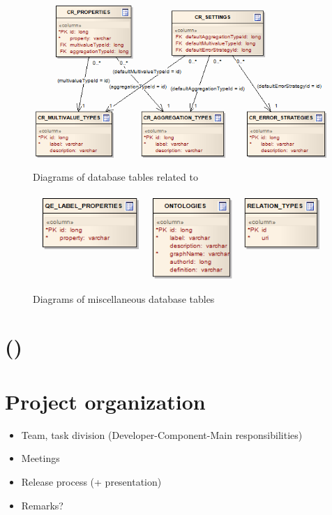 \begin{figure}[htbp]
    \centering
    \includegraphics[scale=0.6]{images/db-cr.png}
    \caption{Diagrams of database tables related to \CR}
	\label{fig:dbCR}
\end{figure}

\begin{figure}[htbp]
    \centering
    \includegraphics[scale=0.6]{images/db-misc.png}
    \caption{Diagrams of miscellaneous database tables}
	\label{fig:dbMisc}
\end{figure}

\chapter{()}

\chapter{Project organization}

\begin{itemize}
	\item Team, task division (Developer-Component-Main responsibilities)
	\item Meetings
	\item Release process (+ presentation)
	\item Remarks?
\end{itemize}


